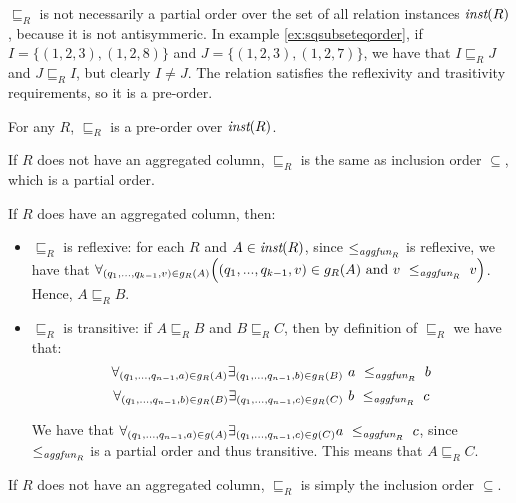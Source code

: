 $\sqsubseteq_R$ is not necessarily a partial order over the set of all relation instances $\textit{inst}(R)$, because it is not antisymmeric. In example \ref{ex:sqsubseteqorder}, if $I = \{(1, 2, 3), (1, 2, 8)\}$ and $J = \{(1, 2, 3), (1, 2, 7)\}$, we have that $I \sqsubseteq_R J$ and $J \sqsubseteq_R I$, but clearly $I \ne J$. The relation satisfies the reflexivity and trasitivity requirements, so it is a pre-order.

\begin{lem}\label{lem:preorder}
For any $R$, $\sqsubseteq_R$ is a pre-order over $\textit{inst}(R)$.
\end{lem}

\begin{prof}

If $R$ does not have an aggregated column, $\sqsubseteq_R$ is the same as inclusion order $\subseteq$, which is a partial order.

If $R$ does have an aggregated column, then:

\begin{itemize}
\item $\sqsubseteq_R$ is reflexive: for each $R$ and $A \in \textit{inst}(R)$, since $\le_{\textit{aggfun}_R}$ is reflexive, we have that $\forall_{(q_1, ..., q_{k-1}, v) \in g_R(A)} \Big( (q_1, ..., q_{k-1}, v) \in g_R(A)~\text{and}~v~\le_{\textit{aggfun}_R}~v \Big)$. Hence, $A \sqsubseteq_R B$.
\item $\sqsubseteq_R$ is transitive: if $A \sqsubseteq_R B$ and $B \sqsubseteq_R  C$, then by definition of $\sqsubseteq_R$ we have that: $$\forall_{(q_1, ..., q_{n-1}, a) \in g_R(A)} \exists_{(q_1, ..., q_{n-1}, b) \in g_R(B)}~a~\le_{\textit{aggfun}_R}~b $$ $$\forall_{(q_1, ..., q_{n-1}, b) \in g_R(B)} \exists_{(q_1, ..., q_{n-1}, c) \in g_R(C)}~b~\le_{\textit{aggfun}_R}~c$$

We have that $\forall_{(q_1, ..., q_{n-1}, a) \in g(A)} \exists_{(q_1, ..., q_{n-1}, c) \in g(C)} a~\le_{\textit{aggfun}_R}~c $, since $\le_{\textit{aggfun}_R}$ is a partial order and thus transitive. This means that $A \sqsubseteq_R C$.
\end{itemize}

\end{prof}



\begin{rem}
If $R$ does not have an aggregated column, $\sqsubseteq_R$ is simply the inclusion order $\subseteq$. 
\end{rem}


